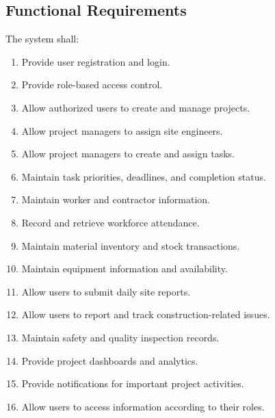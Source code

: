 \documentclass[11pt,a4paper]{article}
\begin{document}
\subsection{Functional Requirements}
The system shall:
\begin{enumerate}[itemsep=1pt]
\item Provide user registration and login.
\item Provide role-based access control.
\item Allow authorized users to create and manage projects.
\item Allow project managers to assign site engineers.
\item Allow project managers to create and assign tasks.
\item Maintain task priorities, deadlines, and completion status.
\item Maintain worker and contractor information.
\item Record and retrieve workforce attendance.
\item Maintain material inventory and stock transactions.
\item Maintain equipment information and availability.
\item Allow users to submit daily site reports.
\item Allow users to report and track construction-related issues.
\item Maintain safety and quality inspection records.
\item Provide project dashboards and analytics.
\item Provide notifications for important project activities.
\item Allow users to access information according to their roles.
\end{enumerate}
\end{document}
